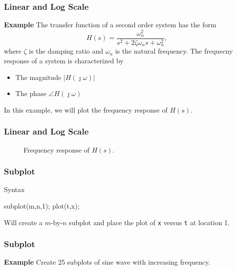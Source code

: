 \documentclass[compress]{beamer}  %
\begin{document}
\begin{frame}[fragile]
\frametitle{Linear and Log Scale}
\textbf{Example} 
The transfer function of a second order system has the form
$$H(s) = \frac{\omega_n^2}{s^2 + 2 \zeta \omega_n s + \omega_n^2},$$
where $\zeta$ is the damping ratio and $\omega_n$ is the natural frequency.
\pause
The frequecny response of a system is characterized by
\begin{itemize}
    \item The magnitude $|H(\jmath \omega)|$
    \item The phase $\angle H(\jmath \omega)$
\end{itemize}

In this example, we will plot the frequency response of $H(s)$.

\end{frame}
\begin{frame}[fragile]
\frametitle{Linear and Log Scale}

\setcounter{subfigure}{0}
\begin{figure}
    \centering
    \caption{Frequency response of $H(s)$.}
\end{figure}

\end{frame}
\begin{frame}[fragile]
\frametitle{Subplot}

\begin{block}{Syntax}
          \begin{matlabcodebeamer}[frame=none]
          subplot(m,n,1);
          plot(t,x);
          \end{matlabcodebeamer}
Will create a $m$-by-$n$ subplot and place the plot of \texttt{x} versus \texttt{t} at location 1.
\end{block}
\end{frame}
\begin{frame}[fragile]
\frametitle{Subplot}
\textbf{Example} 
Create 25 subplots of sine wave with increasing frequency.
\setcounter{subfigure}{0}
\begin{figure}
    \centering
\end{figure}

\end{frame}
\end{document}
